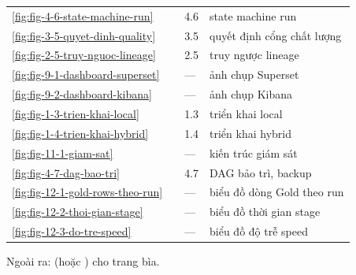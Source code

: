 \begin{xltabular}{\linewidth}{@{}C{12mm}L{58mm}L{18mm}Y@{}}
  \ref{fig:fig-4-6-state-machine-run} &  & 4.6 & state machine run \\
  \ref{fig:fig-3-5-quyet-dinh-quality} &  & 3.5 & quyết định cổng chất lượng \\
  \ref{fig:fig-2-5-truy-nguoc-lineage} &  & 2.5 & truy ngược lineage \\
  \ref{fig:fig-9-1-dashboard-superset} &  & --- & ảnh chụp Superset \\
  \ref{fig:fig-9-2-dashboard-kibana} &  & --- & ảnh chụp Kibana \\
  \ref{fig:fig-1-3-trien-khai-local} &  & 1.3 & triển khai local \\
  \ref{fig:fig-1-4-trien-khai-hybrid} &  & 1.4 & triển khai hybrid \\
  \ref{fig:fig-11-1-giam-sat} &  & --- & kiến trúc giám sát \\
  \ref{fig:fig-4-7-dag-bao-tri} &  & 4.7 & DAG bảo trì, backup \\
  \ref{fig:fig-12-1-gold-rows-theo-run} &  & --- & biểu đồ dòng Gold theo run \\
  \ref{fig:fig-12-2-thoi-gian-stage} &  & --- & biểu đồ thời gian stage \\
  \ref{fig:fig-12-3-do-tre-speed} &  & --- & biểu đồ độ trễ speed \\
  \bottomrule
\end{xltabular}
Ngoài ra:  (hoặc ) cho trang bìa.
